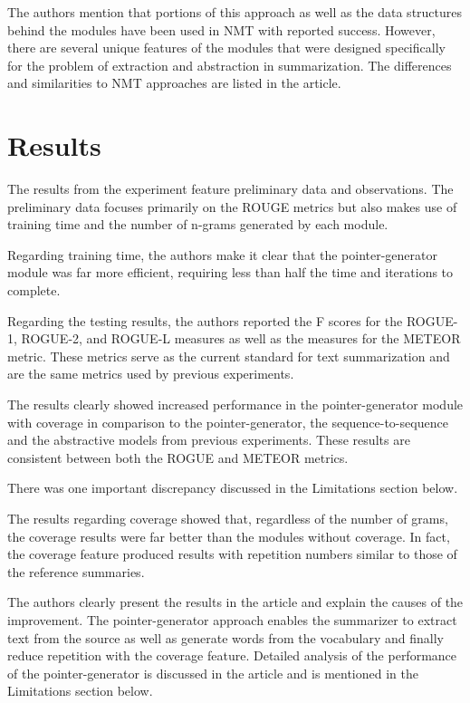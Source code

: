 \documentclass[11pt]{article}
\begin{document}
The authors mention that portions of this approach as well as the data structures behind the modules have been used in NMT with reported success. However, there are several unique features of the modules that were designed specifically for the problem of extraction and abstraction in summarization. The differences and similarities to NMT approaches are listed in the article. 

\section{Results}

The results from the experiment feature preliminary data and observations. The preliminary data focuses primarily on the ROUGE metrics but also makes use of training time and the number of n-grams generated by each module. 

Regarding training time, the authors make it clear that the pointer-generator module was far more efficient, requiring less than half the time and iterations to complete.

Regarding the testing results, the authors reported the F scores for the ROGUE-1, ROGUE-2, and ROGUE-L measures as well as the measures for the METEOR metric. These metrics serve as the current standard for text summarization and are the same metrics used by previous experiments. 

The results clearly showed increased performance in the pointer-generator module with coverage in comparison to the pointer-generator, the sequence-to-sequence and the abstractive models from previous experiments. These results are consistent between both the ROGUE and METEOR metrics.

There was one important discrepancy discussed in the Limitations section below.

The results regarding coverage showed that, regardless of the number of grams, the coverage results were far better than the modules without coverage. In fact, the coverage feature produced results with repetition numbers similar to those of the reference summaries.

The authors clearly present the results in the article and explain the causes of the improvement. The pointer-generator approach enables the summarizer to extract text from the source as well as generate words from the vocabulary and finally reduce repetition with the coverage feature. Detailed analysis of the performance of the pointer-generator is discussed in the article and is mentioned in the Limitations section below. 
\end{document}
